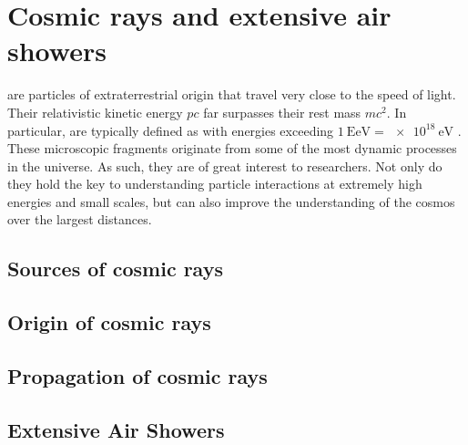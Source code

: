 
\chapter{Cosmic rays and extensive air showers}
\label{chap:cosmic-rays}

\CRs are particles of extraterrestrial origin that travel very close to the 
speed of light. Their relativistic kinetic energy $pc$ far surpasses their rest 
mass $mc^2$. In particular, \UHECRs are typically defined as \CRs with energies
exceeding $\SI{1}{\exa\eV} = \SI{e18}{\eV}$ \cite{AlvesBatista2019}. These
microscopic fragments originate from some of the most dynamic processes in the 
universe. As such, they are of great interest to researchers. Not only do they 
hold the key to understanding particle interactions at extremely high energies 
and small scales, but can also improve the understanding of the cosmos over the
largest distances.



\section{Sources of cosmic rays}
\label{sec:cr-accelerators}



\section{Origin of cosmic rays}
\label{sec:cr-origins}


\section{Propagation of cosmic rays}
\label{sec:cr-propagation}



\section{Extensive Air Showers}
\label{sec:extensive-air-showers}



